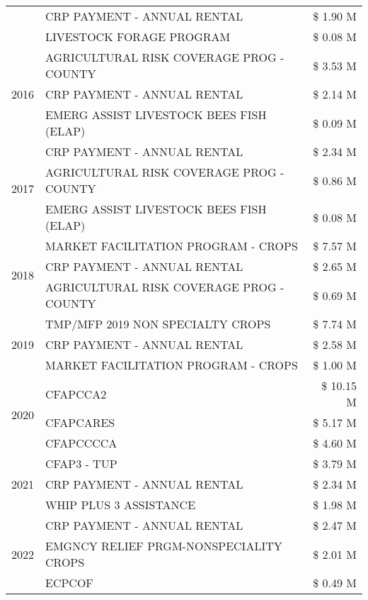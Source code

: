 \begin{tabular}{llr}
 & CRP PAYMENT - ANNUAL RENTAL & \$ 1.90 M \\
 & LIVESTOCK FORAGE PROGRAM & \$ 0.08 M \\
\cline{1-3}
\multirow[t]{3}{*}{2016} & AGRICULTURAL RISK COVERAGE PROG - COUNTY & \$ 3.53 M \\
 & CRP PAYMENT - ANNUAL RENTAL & \$ 2.14 M \\
 & EMERG ASSIST LIVESTOCK BEES FISH (ELAP) & \$ 0.09 M \\
\cline{1-3}
\multirow[t]{3}{*}{2017} & CRP PAYMENT - ANNUAL RENTAL & \$ 2.34 M \\
 & AGRICULTURAL RISK COVERAGE PROG - COUNTY & \$ 0.86 M \\
 & EMERG ASSIST LIVESTOCK BEES FISH (ELAP) & \$ 0.08 M \\
\cline{1-3}
\multirow[t]{3}{*}{2018} & MARKET FACILITATION PROGRAM - CROPS & \$ 7.57 M \\
 & CRP PAYMENT - ANNUAL RENTAL & \$ 2.65 M \\
 & AGRICULTURAL RISK COVERAGE PROG - COUNTY & \$ 0.69 M \\
\cline{1-3}
\multirow[t]{3}{*}{2019} & TMP/MFP 2019 NON SPECIALTY CROPS & \$ 7.74 M \\
 & CRP PAYMENT - ANNUAL RENTAL & \$ 2.58 M \\
 & MARKET FACILITATION PROGRAM - CROPS & \$ 1.00 M \\
\cline{1-3}
\multirow[t]{3}{*}{2020} & CFAPCCA2 & \$ 10.15 M \\
 & CFAPCARES & \$ 5.17 M \\
 & CFAPCCCCA & \$ 4.60 M \\
\cline{1-3}
\multirow[t]{3}{*}{2021} & CFAP3 - TUP & \$ 3.79 M \\
 & CRP PAYMENT - ANNUAL RENTAL & \$ 2.34 M \\
 & WHIP PLUS 3 ASSISTANCE & \$ 1.98 M \\
\cline{1-3}
\multirow[t]{3}{*}{2022} & CRP PAYMENT - ANNUAL RENTAL & \$ 2.47 M \\
 & EMGNCY RELIEF PRGM-NONSPECIALITY CROPS & \$ 2.01 M \\
 & ECPCOF & \$ 0.49 M \\
\cline{1-3}
\bottomrule
\end{tabular}
